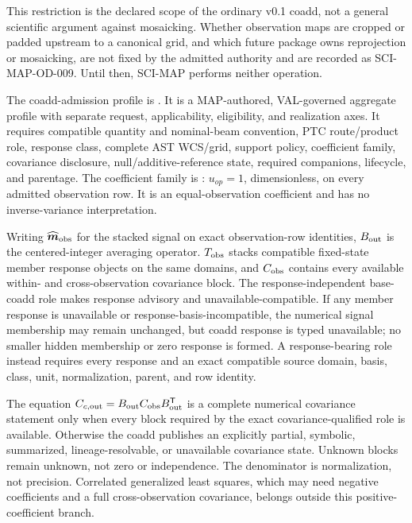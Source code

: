 \documentclass[10pt]{article}
\begin{document}
This restriction is the declared scope of the ordinary v0.1 coadd, not a
general scientific argument against mosaicking. Whether observation maps are
cropped or padded upstream to a canonical grid, and which future package owns
reprojection or mosaicking, are not fixed by the admitted authority and are
recorded as SCI-MAP-OD-009. Until then, SCI-MAP performs neither operation.

The coadd-admission profile is
\SCIMapCoaddProfile. It is a MAP-authored,
VAL-governed aggregate profile with separate request, applicability,
eligibility, and realization axes. It requires compatible quantity
and nominal-beam convention, PTC route/product role, response class, complete
AST WCS/grid, support policy, coefficient family, covariance disclosure,
null/additive-reference state, required companions, lifecycle, and parentage.
The coefficient family is
\SCIMapUniformCoaddProfile: \(u_{op}=1\),
dimensionless, on every admitted observation row. It is an equal-observation
coefficient and has no inverse-variance interpretation.

Writing \(\widehat{\boldsymbol m}_{\rm obs}\) for the stacked signal on exact
observation-row identities, \(B_{\rm out}\) is the centered-integer averaging
operator. \(T_{\rm obs}\) stacks compatible fixed-state member response objects on the
same domains, and \(C_{\rm obs}\) contains every available within- and
cross-observation covariance block. The response-independent base-coadd role
makes response advisory and unavailable-compatible. If any member response is
unavailable or response-basis-incompatible, the numerical signal membership
may remain unchanged, but coadd response is typed unavailable; no smaller
hidden membership or zero response is formed. A response-bearing role instead
requires every response and an exact compatible source domain, basis, class,
unit, normalization, parent, and row identity.

The equation \(C_{c,{\rm out}}=B_{\rm out}C_{\rm obs}B_{\rm out}^{\mathsf T}\)
is a complete numerical covariance statement only when every block required
by the exact covariance-qualified role is available. Otherwise the coadd
publishes an explicitly partial, symbolic, summarized, lineage-resolvable, or
unavailable covariance state. Unknown blocks remain unknown, not zero or
independence. The denominator is normalization,
not precision. Correlated generalized least squares, which may
need negative coefficients and a full cross-observation covariance, belongs
outside this positive-coefficient branch.
\end{document}
